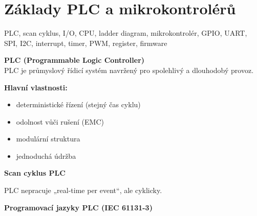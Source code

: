 \documentclass[a4paper,10pt]{article}
\begin{document}
\section{Základy PLC a mikrokontrolérů}

\begin{pojmybox}
PLC, scan cyklus, I/O, CPU, ladder diagram,
mikrokontrolér, GPIO, UART, SPI, I2C,
interrupt, timer, PWM, register, firmware
\end{pojmybox}

\begin{vysvetlenibox}

\textbf{PLC (Programmable Logic Controller)}\\
PLC je průmyslový řídicí systém navržený pro spolehlivý a dlouhodobý provoz.

\textbf{Hlavní vlastnosti:}
\begin{itemize}
\item deterministické řízení (stejný čas cyklu)
\item odolnost vůči rušení (EMC)
\item modulární struktura
\item jednoduchá údržba
\end{itemize}

\textbf{Scan cyklus PLC}

\begin{center}
\end{center}

 PLC nepracuje „real-time per event“, ale cyklicky.

\textbf{Programovací jazyky PLC (IEC 61131-3)}


\end{vysvetlenibox}
\end{document}
